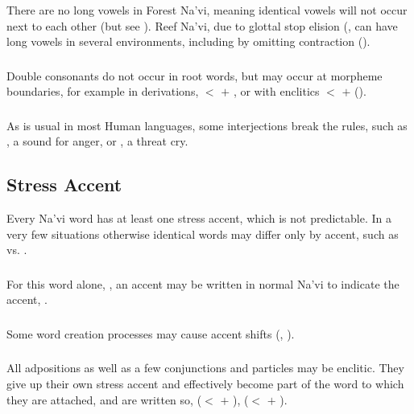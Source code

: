 \subsubsection{} There are no long vowels in Forest Na'vi, meaning
identical vowels will not occur next to each other (but see
).  Reef Na'vi, due to glottal stop
elision (, can have long vowels in several
environments, including by omitting contraction
(). 

\subsubsection{} Double consonants do not occur in root words, but
may occur at morpheme boundaries, for example in derivations,
 $<$  $+$ , or with enclitics
 $<$  $+$  ().

\subsubsection{} As is usual in most Human languages, some
interjections break the rules, such as , a sound for anger, or
, a threat cry.


\subsection{Stress Accent}
Every Na'vi word has at least one stress accent, which is not
predictable.  In a very few situations otherwise identical words may
differ only by accent, such as  
vs.  .

\subsubsection{} For this word alone, , an accent may be
written in normal Na'vi to indicate the accent, .

\subsubsection{} Some word creation processes may cause accent shifts
(, ).

\subsubsection{} All adpositions as well as a few conjunctions and
particles may be enclitic.  They give up their own stress accent and
effectively become part of the word to which they are attached, and
are written so,  ($<$  $+$ ),
 ($<$  $+$ ).
\label{l-and-s:stress:enclisis}


